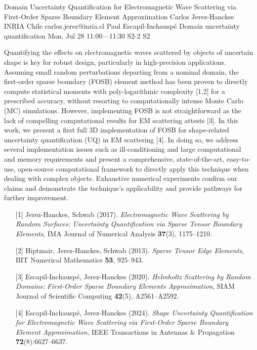\begin{talk}
  {Domain Uncertainty Quantification for Electromagnetic Wave Scattering via First-Order Sparse Boundary Element Approximation}%
  {Carlos Jerez-Hanckes}%
  {INRIA Chile}%
  {carlos.jerez@inria.cl}%
  {Paul Escapil-Inchausp\'e}%
  {Domain uncertainty quantification}%
  {Mon, Jul 28 11:00---11:30}%
  {S2-2}%
  {S2}%
    
   
Quantifying the effects on electromagnetic waves scattered by objects of uncertain shape is key for robust design, particularly in high-precision applications. Assuming small random perturbations departing from a nominal domain, the first-order sparse boundary (FOSB) element method has been proven to directly compute statistical moments with poly-logarithmic complexity [1,2] for a prescribed accuracy, without resorting to computationally intense Monte Carlo (MC) simulations. However, implementing FOSB is not straightforward as the lack of compelling computational results for EM scattering attests [3]. In this work, we present a first full 3D implementation of FOSB for shape-related uncertainty quantification (UQ) in EM scattering [4]. In doing so, we address several implementation issues such as ill-conditioning and large computational and memory requirements and present a comprehensive, state-of-the-art, easy-to-use, open-source computational framework to directly apply this technique when dealing with complex objects. Exhaustive numerical experiments confirm our claims and demonstrate the technique's applicability and provide pathways for further improvement.

\medskip

\begin{enumerate}
 \item[{[1]}] Jerez-Hanckes, Schwab (2017). {\it Electromagnetic Wave Scattering by Random Surfaces: Uncertainty Quantification via Sparse Tensor Boundary Elements}, IMA Journal of Numerical Analysis {\bf 37}(3), 1175--1210.
 \item[{[2]}] Hiptmair, Jerez-Hanckes, Schwab (2013). {\it Sparse Tensor Edge Elements}, BIT Numerical Mathematics {\bf 53}, 925--943.
 \item[{[3]}] Escapil-Inchausp\'e, Jerez-Hanckes (2020). {\it Helmholtz Scattering by Random Domains: First-Order Sparse Boundary Elements Approximation}, SIAM Journal of Scientific Computing {\bf 42}(5), A2561--A2592.
 \item[{[4]}] Escapil-Inchausp\'e, Jerez-Hanckes (2024). {\it Shape Uncertainty Quantification for Electromagnetic Wave Scattering via First-Order Sparse Boundary Element Approximation}, IEEE Transactions in Antennas \& Propagation {\bf 72}(8):6627--6637.
\end{enumerate}


\end{talk}
